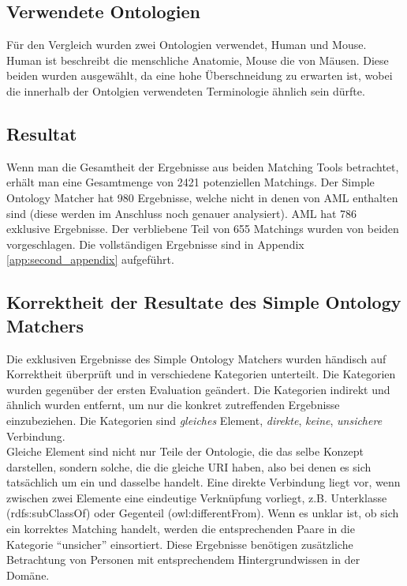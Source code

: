 		\subsection{Verwendete Ontologien}
		Für den Vergleich wurden zwei Ontologien verwendet, Human und Mouse. Human
		ist beschreibt die menschliche Anatomie, Mouse die von Mäusen. Diese beiden
		wurden ausgewählt, da eine hohe Überschneidung zu erwarten ist, wobei die
		innerhalb der Ontolgien verwendeten Terminologie ähnlich sein dürfte.
		
		\subsection{Resultat}
		Wenn man die Gesamtheit der Ergebnisse aus beiden Matching Tools betrachtet,
		erhält man eine Gesamtmenge von 2421 potenziellen Matchings. Der Simple
		Ontology Matcher hat 980 Ergebnisse, welche nicht in denen von AML enthalten
		sind (diese werden im Anschluss noch genauer analysiert). AML hat 786
		exklusive Ergebnisse. Der verbliebene Teil von 655 Matchings wurden von beiden
		vorgeschlagen. Die vollständigen Ergebnisse sind in Appendix \ref{app:second_appendix}
		aufgeführt.
		
		\subsection{Korrektheit der Resultate des Simple Ontology Matchers}
		Die exklusiven Ergebnisse des Simple Ontology Matchers wurden händisch auf
		Korrektheit überprüft und in verschiedene Kategorien unterteilt. Die
		Kategorien wurden gegenüber der ersten Evaluation geändert. Die Kategorien
		indirekt und ähnlich wurden entfernt, um nur die konkret zutreffenden
		Ergebnisse einzubeziehen. Die Kategorien sind \textit{gleiches} Element,
		\textit{direkte}, \textit{keine}, \textit{unsichere} Verbindung.\\
		Gleiche Element sind nicht nur Teile der Ontologie, die das
		selbe Konzept darstellen, sondern solche, die die gleiche URI haben, also bei denen
		es sich tatsächlich um ein und dasselbe handelt. Eine direkte Verbindung liegt
		vor, wenn zwischen zwei Elemente eine eindeutige Verknüpfung vorliegt, z.B.
		Unterklasse (rdfs:subClassOf) oder Gegenteil (owl:differentFrom). Wenn
		es unklar ist, ob sich ein korrektes Matching handelt, werden die entsprechenden Paare in die
		Kategorie "`unsicher"' einsortiert. Diese Ergebnisse benötigen zusätzliche
		Betrachtung von Personen mit entsprechendem Hintergrundwissen in der Domäne.\\
		
